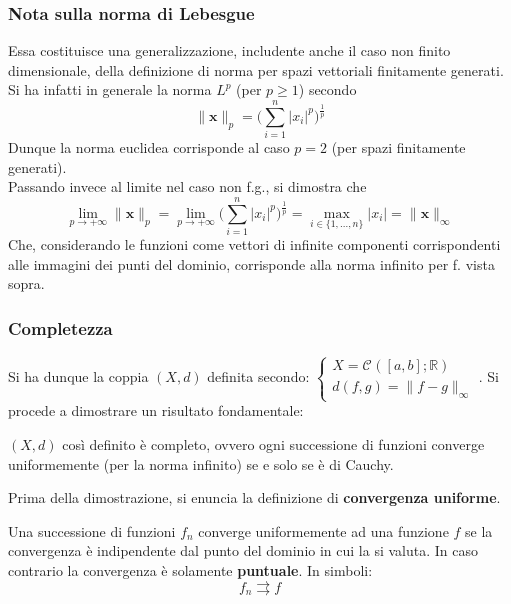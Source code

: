 \documentclass[10pt, oneside]{book}
\theoremstyle{plain}
\begin{document}
\subsubsection{Nota sulla norma di Lebesgue} Essa costituisce una generalizzazione, includente anche il caso non finito dimensionale, della definizione di norma per spazi vettoriali finitamente generati. Si ha infatti in generale la norma $\mathit{L}^p$ (per $p \geq 1$) secondo
\[\|\mathbf{x}\|_{p} = \big(\sum\limits_{i=1}^n |x_i|^p\big)^{\frac{1}{p}}\]
Dunque la norma euclidea corrisponde al caso $p = 2$ (per spazi finitamente generati).
\\Passando invece al limite nel caso non f.g., si dimostra che 
\[\lim\limits_{p \rightarrow +\infty} \|\mathbf{x}\|_p = \lim\limits_{p \rightarrow +\infty}\big(\sum\limits_{i=1}^n |x_i|^p\big)^{\frac{1}{p}} = \max\limits_{i \in \{1, ..., n\}} |x_i| = \|\mathbf{x}\|_\infty\]
Che, considerando le funzioni come vettori di infinite componenti corrispondenti alle immagini dei punti del dominio, corrisponde alla norma infinito per f. vista sopra.

\subsubsection{Completezza} Si ha dunque la coppia $(X,d)$ definita secondo: $\displaystyle \begin{cases}
X = \mathcal{C}^{}([a,b] ; \mathbb{R})\\
d(f,g) = \|f - g\|_\infty
\end{cases}$. Si procede a dimostrare un risultato fondamentale:

\begin{ther}
$(X,d)$ così definito è completo, ovvero ogni successione di funzioni converge uniformemente (per la norma infinito) se e solo se è di Cauchy.
\end{ther}
Prima della dimostrazione, si enuncia la definizione di \textbf{convergenza uniforme}.
\begin{defin}
	Una successione di funzioni $f_n$ converge uniformemente ad una funzione $f$ se la convergenza è indipendente dal punto del dominio in cui la si valuta. In caso contrario la convergenza è solamente \textbf{puntuale}. In simboli:
	\[f_n \rightrightarrows f\]
\end{defin}
\end{document}
